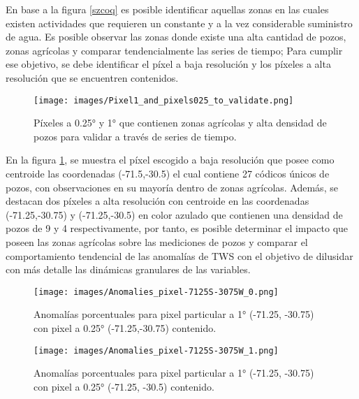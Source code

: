 En base a la figura \ref{szcoq} es posible identificar aquellas zonas en las cuales existen actividades que requieren un constante y a la vez considerable suministro de agua. Es posible observar las zonas donde existe una alta cantidad de pozos, zonas agrícolas y comparar
tendencialmente las series de tiempo; Para cumplir ese objetivo, se debe identificar el píxel a baja resolución y los píxeles a alta resolución que se encuentren contenidos.

\begin{figure}[H]
    \centering
          \texttt{[image: images/Pixel1\_and\_pixels025\_to\_validate.png]}
          \vskip -0.1in
    \caption[Píxeles a 0.25° y 1° que contienen zonas agrícolas y alta densidad de pozos]{\footnotesize Píxeles a 0.25° y 1° que contienen zonas agrícolas y alta densidad de pozos para validar a través de series de tiempo.}
    \label{pixelscoq}
\end{figure}
En la figura \ref{pixelscoq}, se muestra el píxel escogido a baja resolución que posee como centroide las coordenadas (-71.5,-30.5) el cual contiene 27 códicos únicos de pozos, con observaciones en su mayoría dentro de zonas agrícolas. Además, se destacan dos píxeles a alta resolución con centroide en las coordenadas 
(-71.25,-30.75) y (-71.25,-30.5) en color azulado que contienen una densidad de pozos de 9 y 4 respectivamente, por tanto, es posible determinar el impacto
que poseen las zonas agrícolas sobre las mediciones de pozos y comparar el comportamiento tendencial de las anomalías de TWS con el objetivo de dilusidar con más detalle las dinámicas granulares de las variables.


\begin{figure}[H]
    \centering
          \texttt{[image: images/Anomalies\_pixel-7125S-3075W\_0.png]}
          \vskip -0.1in
    \caption[Series de tiempo para pixel particular a 1° con pixel a 0.25° contenido]{\footnotesize Anomalías porcentuales para pixel particular a 1° (-71.25, -30.75) con pixel a 0.25° (-71.25,-30.75) contenido.}
    \label{tspixel0}
\end{figure}

\begin{figure}[H]
    \centering
          \texttt{[image: images/Anomalies\_pixel-7125S-3075W\_1.png]}
          \vskip -0.1in
    \caption[Series de tiempo para pixel particular a 1° con pixel a 0.25° contenido]{\footnotesize Anomalías porcentuales para pixel particular a 1° (-71.25, -30.75) con pixel a 0.25° (-71.25, -30.5) contenido.}
    \label{tspixel1}
\end{figure}

